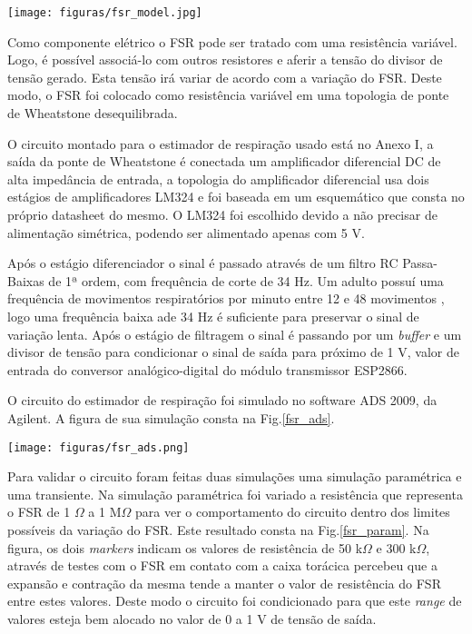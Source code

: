     \begin{center}
    	\texttt{[image: figuras/fsr\_model.jpg]}
        \label{fsr_model}
    \end{center}

	Como componente elétrico o FSR pode ser tratado com uma resistência variável. Logo, é possível associá-lo com outros resistores e aferir a tensão do divisor de tensão gerado. Esta tensão irá variar de acordo com a variação do FSR. Deste modo, o FSR foi colocado como resistência variável em uma topologia de ponte de Wheatstone desequilibrada.

	O circuito montado para o estimador de respiração usado está no Anexo I, a saída da ponte de Wheatstone é conectada um amplificador diferencial DC de alta impedância de entrada, a topologia do amplificador diferencial usa dois estágios de amplificadores LM324 e foi baseada em um esquemático que consta no próprio datasheet do mesmo. O LM324 foi escolhido devido a não precisar de alimentação simétrica, podendo ser alimentado apenas com 5 V.

	Após o estágio diferenciador o sinal é passado através de um filtro RC Passa-Baixas de 1ª ordem, com frequência de corte de 34 Hz. Um adulto possuí uma frequência de movimentos respiratórios por minuto entre 12 e 48 movimentos \cite{siate}, logo uma frequência baixa ade 34 Hz é suficiente para preservar o sinal de variação lenta. Após o estágio de filtragem o sinal é passando por um \textit{buffer} e um divisor de tensão para condicionar o sinal de saída para próximo de 1 V, valor de entrada do conversor analógico-digital do módulo transmissor ESP2866.

    O circuito do estimador de respiração foi simulado no software ADS 2009, da Agilent. A figura de sua simulação consta na Fig.\ref{fsr_ads}.


    \begin{center}
    	\texttt{[image: figuras/fsr\_ads.png]}
        \label{fsr_ads}
    \end{center}

 	Para validar o circuito foram feitas duas simulações uma simulação paramétrica e uma transiente. Na simulação paramétrica foi variado a resistência que representa o FSR de 1 $\Omega$ a 1 M$\Omega$ para ver o comportamento do circuito dentro dos limites possíveis da variação do FSR. Este resultado consta na Fig.\ref{fsr_param}. Na figura, os dois \textit{markers} indicam os valores de resistência de 50 k$\Omega$ e 300 k$\Omega$, através de testes com o FSR em contato com a caixa torácica percebeu que a expansão e contração da mesma tende a manter o valor de resistência do FSR entre estes valores. Deste modo o circuito foi condicionado para que este \textit{range} de valores esteja bem alocado no valor de 0 a 1 V de tensão de saída.


